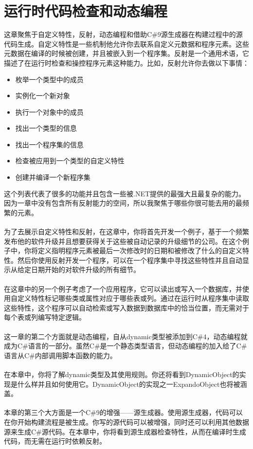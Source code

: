 \section{运行时代码检查和动态编程}
这章聚焦于自定义特性，反射，动态编程和借助C\#9源生成器在构建过程中的源代码生成。自定义特性是一些机制他允许你去联系自定义元数据和程序元素。这些元数据在编译的时候被创建，并且被嵌入到一个程序集。反射是一个通用术语，它描述了在运行时检查和操控程序元素这种能力。比如，反射允许你去做以下事情：
\begin{itemize}
    \item 枚举一个类型中的成员
    \item 实例化一个新对象
    \item 执行一个对象中的成员
    \item 找出一个类型的信息
    \item 找出一个程序集的信息
    \item 检查被应用到一个类型的自定义特性
    \item 创建并编译一个新程序集
\end{itemize}
这个列表代表了很多的功能并且包含一些被.NET提供的最强大且最复杂的能力。因为一章中没有包含所有反射能力的空间，所以我聚焦于哪些你很可能去用的最频繁的元素。
\\ \\
为了去展示自定义特性和反射，在这章中，你将首先开发一个例子，基于一个频繁发布他的软件升级并且想要获得关于这些被自动记录的升级细节的公司。在这个例子中，你将定义指明程序元素被最后一次修改时的日期和被修改了什么的自定义特性。然后你使用反射开发一个程序，可以在一个程序集中寻找这些特性并且自动显示从给定日期开始的对软件升级的所有细节。
\\ \\
在这章中的另一个例子考虑了一个应用程序，它可以读出或写入一个数据库，并使用自定义特性标记哪些类或属性对应于哪些表或列。通过在运行时从程序集中读取这些特性，这个程序可以自动检索或写入数据到数据库中的恰当位置，而无需对于每个表或列编写特定逻辑。
\\ \\
这一章的第二个方面就是动态编程，自从dynamic类型被添加到C\#4，动态编程就成为C\#语言的一部分。虽然C\#是一个静态类型语言，但动态编程的加入给了C\#语言从C\#内部调用脚本函数的能力。
\\ \\
在本章中，你将了解dynamic类型及其使用规则。你还将看到DynamicObject的实现是什么样并且如何使用它。DynamicObject的实现之一ExpandoObject也将被涵盖。
\\ \\
本章的第三个大方面是一个C\#9的增强——源生成器。使用源生成器，代码可以在你开始构建流程是被生成。你写的源代码可以被增强，同时还可以利用其他数据源来生成C\#源代码。在本章中，你将看到源生成器检查特性，从而在编译时生成代码，而无需在运行时依赖反射。

